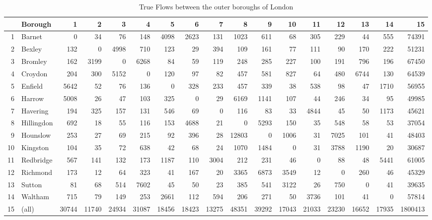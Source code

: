 \documentclass[11pt]{article} %
\begin{document}
\begin{table}
\footnotesize
\caption{True Flows between the outer boroughs of London}
\begin{tabular}{|r|l|r|r|r|r|r|r|r|r|r|r|r|r|r|r|r|}
\hline
\multicolumn{1}{|l|}{} & Borough & 1 & 2 & 3 & 4 & 5 & 6 & 7 & 8 & 9 & 10 & 11 & 12 & 13 & 14 & 15 \\ \hline
1 & Barnet & 0 & 34 & 76 & 148 & 4098 & 2623 & 131 & 1023 & 611 & 68 & 305 & 229 & 44 & 555 & 74391 \\ \hline
2 & Bexley & 132 & 0 & 4998 & 710 & 123 & 29 & 394 & 109 & 161 & 77 & 111 & 90 & 170 & 222 & 51231 \\ \hline
3 & Bromley & 162 & 3199 & 0 & 6268 & 84 & 59 & 119 & 248 & 285 & 227 & 100 & 191 & 796 & 196 & 67450 \\ \hline
4 & Croydon & 204 & 300 & 5152 & 0 & 120 & 97 & 82 & 457 & 581 & 827 & 64 & 480 & 6744 & 130 & 64539 \\ \hline
5 & Enfield & 5642 & 52 & 76 & 136 & 0 & 328 & 233 & 457 & 339 & 38 & 538 & 98 & 47 & 1710 & 56955 \\ \hline
6 & Harrow & 5008 & 26 & 47 & 103 & 325 & 0 & 29 & 6169 & 1141 & 107 & 44 & 246 & 34 & 95 & 49985 \\ \hline
7 & Havering & 194 & 325 & 157 & 131 & 546 & 69 & 0 & 116 & 83 & 33 & 4844 & 45 & 50 & 1173 & 45621 \\ \hline
8 & Hillingdon & 692 & 18 & 55 & 116 & 153 & 4688 & 21 & 0 & 5293 & 150 & 35 & 548 & 58 & 53 & 37054 \\ \hline
9 & Hounslow & 253 & 27 & 69 & 215 & 92 & 396 & 28 & 12803 & 0 & 1006 & 31 & 7025 & 101 & 41 & 48403 \\ \hline
10 & Kingston & 104 & 35 & 72 & 638 & 42 & 68 & 24 & 1070 & 1484 & 0 & 31 & 3788 & 1190 & 20 & 30687 \\ \hline
11 & Redbridge & 567 & 141 & 132 & 173 & 1187 & 110 & 3004 & 212 & 231 & 46 & 0 & 88 & 48 & 5441 & 61005 \\ \hline
12 & Richmond & 173 & 12 & 64 & 323 & 41 & 167 & 20 & 3365 & 6873 & 3549 & 12 & 0 & 260 & 46 & 45329 \\ \hline
13 & Sutton & 81 & 68 & 514 & 7602 & 45 & 50 & 23 & 385 & 541 & 3122 & 26 & 750 & 0 & 41 & 39635 \\ \hline
14 & Waltham & 715 & 79 & 149 & 253 & 2661 & 112 & 594 & 206 & 271 & 50 & 3736 & 101 & 41 & 0 & 57814 \\ \hline
15 & (all) & 30744 & 11740 & 24934 & 31087 & 18456 & 18423 & 13275 & 48351 & 39292 & 17043 & 21033 & 23230 & 16652 & 17935 & 1800413 \\ \hline
\end{tabular}
\label{Actual Flows Outer}
\end{table}
\end{document}

